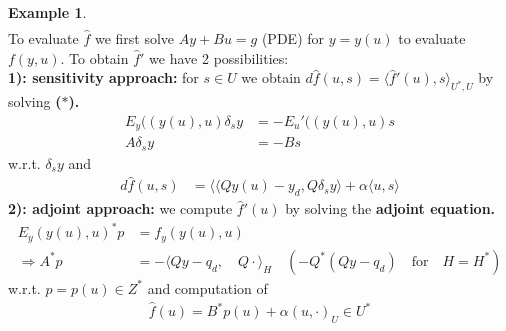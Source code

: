 \documentclass[a4paper,11pt,fleqn]{book}
\theoremstyle{definition}
\newtheorem*{example}{Example}
\theoremstyle{remark}
\begin{document}
\begin{example}
\begin{align*}
\end{align*}
To evaluate $\hat{f}$ we first solve $Ay + Bu = g$ (PDE) for $y = y(u)$ to evaluate $f(y, u)$. To obtain $\hat{f}'$ we have 2 possibilities:\\
\textbf{1): sensitivity approach: } for $s \in U$ we obtain $d \hat{f}(u, s) = \langle \hat{f}'(u), s \rangle_{U^*, U}$ by solving \textbf{($*$).}
\begin{align*}
	E_y ((y(u), u) \delta_s y &= - E_u'((y(u), u) s \\
	A\delta_{s}y &= - B s
\end{align*}
w.r.t. $\delta_{s}y$ and 
\begin{align*}
	d\hat{f}(u, s) &= \langle \langle Qy(u) - y_d, Q \delta_s y   \rangle + \alpha \langle u, s\rangle 
\end{align*}
\textbf{2): adjoint approach:}  we compute $\hat{f}'(u)$ by solving the \textbf{adjoint equation.}
\begin{align*}
	E_y(y(u), u)^* p  &= f_y(y(u), u) \\
	\Rightarrow 
	A^* p &= - \langle Qy - q_d, \quad Q \cdot\rangle_H \quad( - Q^*(Qy - q_d) \quad \text{for} \quad H = H^*)
\end{align*}
w.r.t. $p = p(u) \in Z^*$ and computation of 
\begin{align*}
	\hat{f}(u) = B^* p(u) + \alpha (u,  \cdot )_U  \in U^*
\end{align*}
\end{example}
\end{document}
